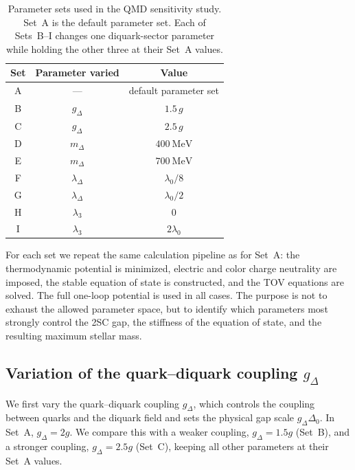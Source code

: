 \begin{table}[H]
\centering
\begin{tabular}{c c c}
\hline
Set & Parameter varied & Value \\
\hline
A & --- & default parameter set \\
\hline
B & \(g_\Delta\) & \(1.5\,g\) \\
C & \(g_\Delta\) & \(2.5\,g\) \\
\hline
D & \(m_\Delta\) & \(400~\mathrm{MeV}\) \\
E & \(m_\Delta\) & \(700~\mathrm{MeV}\) \\
\hline
F & \(\lambda_\Delta\) & \(\lambda_0/8\) \\
G & \(\lambda_\Delta\) & \(\lambda_0/2\) \\
\hline
H & \(\lambda_3\) & \(0\) \\
I & \(\lambda_3\) & \(2\lambda_0\) \\
\hline
\end{tabular}
\caption{Parameter sets used in the QMD sensitivity study. Set~A is the
default parameter set. Each of Sets~B--I changes one diquark-sector
parameter while holding the other three at their Set~A values.}
\label{tab:qmd_param_variations}
\end{table}

For each set we repeat the same calculation pipeline as for Set~A:
the thermodynamic potential is minimized, electric and color
charge neutrality are imposed, the stable equation of state is constructed,
and the TOV equations are solved. The full one-loop potential is used in
all cases. The purpose is not to exhaust the allowed parameter space, but
to identify which parameters most strongly control the 2SC gap, the
stiffness of the equation of state, and the resulting maximum stellar
mass.

\subsection*{Variation of the quark--diquark coupling \(g_\Delta\)}
\label{subsec:qmd_param_gdelta}

We first vary the quark--diquark coupling \(g_\Delta\), which controls
the coupling between quarks and the diquark field and sets the physical
gap scale \(g_\Delta\Delta_0\). In Set~A,
\(g_\Delta=2g\). We compare this with a weaker coupling,
\(g_\Delta=1.5g\) (Set~B), and a stronger coupling,
\(g_\Delta=2.5g\) (Set~C), keeping all other parameters at their
Set~A values.

